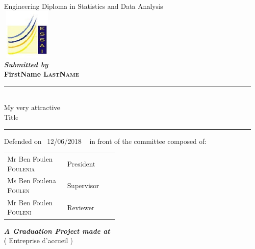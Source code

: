 \documentclass[a4paper, oneside]{report}
\newcommand{\reportAuthor} {%
  FirstName \textsc{LastName}%
}
\newcommand{\reportSubject} {%
  My very attractive \\ Title%
}
\newcommand{\dateSoutenance} {%
  12/06/2018%
}
\newcommand{\studyDepartment} {%
  Entreprise d'accueil %
}
\newcommand{\juryPresident} {%
  Mr Ben Foulen \textsc{Foulenia}%
}
\newcommand{\juryPresidentDesc} {%
  President%
}
\newcommand{\juryMemberOne} {%
  Ms Ben Foulena \textsc{Foulen}%
}
\newcommand{\juryMemberOneDesc} {%
  Supervisor %
}
\newcommand{\juryMemberTwo} {%
  Mr Ben Foulen \textsc{Fouleni}%
}
\newcommand{\juryMemberTwoDesc} {%
  Reviewer%
}
\begin{document}
\begin{titlepage}
\begin{center}
\vspace{10pt}
Engineering Diploma in Statistics and Data Analysis\\

\includegraphics[width=2.5cm, height=2.5cm]{logo-essai.jpg}\\

\vspace{30pt}
\textbf{\textit{Submitted by}}\\
\vspace{10pt} {%
  \fontsize{18pt}{18pt}\selectfont%
  \textbf{\reportAuthor}\\
}%

\vspace{10pt} {%
  \renewcommand*{\familydefault}{\defaultFont}
  \fontsize{27pt}{27pt}\selectfont%
  \rule{0.5\textwidth}{.4pt}\\
  \vspace{10pt}
  \reportSubject{}\\%
  \vspace{10pt}
  \rule{0.5\textwidth}{.4pt}
}

\vspace{10pt}
Defended on~\dateSoutenance~ in front of the committee composed of:\\
\vspace{20pt}
\begin{tabular}{p{0.3\linewidth} p{0.15\linewidth}}
  \juryPresident{} & \juryPresidentDesc{}\\
  \juryMemberOne{} & \juryMemberOneDesc{}\\
  \juryMemberTwo{} & \juryMemberTwoDesc{}\\
\end{tabular}

\vfill

\vspace{30pt}%
\textbf{\textit{A Graduation Project made at}}\\

\vspace{10pt}
(\studyDepartment)\\

\end{center}
\end{titlepage}
\end{document}
